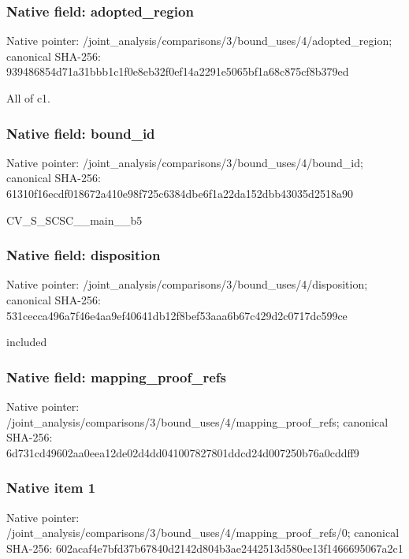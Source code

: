 \documentclass[10pt,a4paper]{article}
\begin{document}
\subsubsection{Native field: adopted\_region}


Native pointer: /joint\_analysis/comparis\allowbreak{}ons/3/bound\_uses/4/adopt\allowbreak{}ed\_region; canonical SHA-256: 939486854d71a31bbb1c1f0e\allowbreak{}8eb32f0ef14a2291e5065bf1\allowbreak{}a68c875cf8b379ed


All of c1.


\subsubsection{Native field: bound\_id}


Native pointer: /joint\_analysis/comparis\allowbreak{}ons/3/bound\_uses/4/bound\allowbreak{}\_id; canonical SHA-256: 61310f16ecdf018672a410e9\allowbreak{}8f725c6384dbe6f1a22da152\allowbreak{}dbb43035d2518a90


CV\_S\_SCSC\_\_main\_\_b5


\subsubsection{Native field: disposition}


Native pointer: /joint\_analysis/comparis\allowbreak{}ons/3/bound\_uses/4/dispo\allowbreak{}sition; canonical SHA-256: 531cecca496a7f46e4aa9ef4\allowbreak{}0641db12f8bef53aaa6b67c4\allowbreak{}29d2c0717dc599ce


included


\subsubsection{Native field: mapping\_proof\_refs}


Native pointer: /joint\_analysis/comparis\allowbreak{}ons/3/bound\_uses/4/mappi\allowbreak{}ng\_proof\_refs; canonical SHA-256: 6d731cd49602aa0eea12de02\allowbreak{}d4dd041007827801ddcd24d0\allowbreak{}07250b76a0cddff9



\subsubsection{Native item 1}


Native pointer: /joint\_analysis/comparis\allowbreak{}ons/3/bound\_uses/4/mappi\allowbreak{}ng\_proof\_refs/0; canonical SHA-256: 602acaf4e7bfd37b67840d21\allowbreak{}42d804b3ae2442513d580ee1\allowbreak{}3f1466695067a2c1
\end{document}
